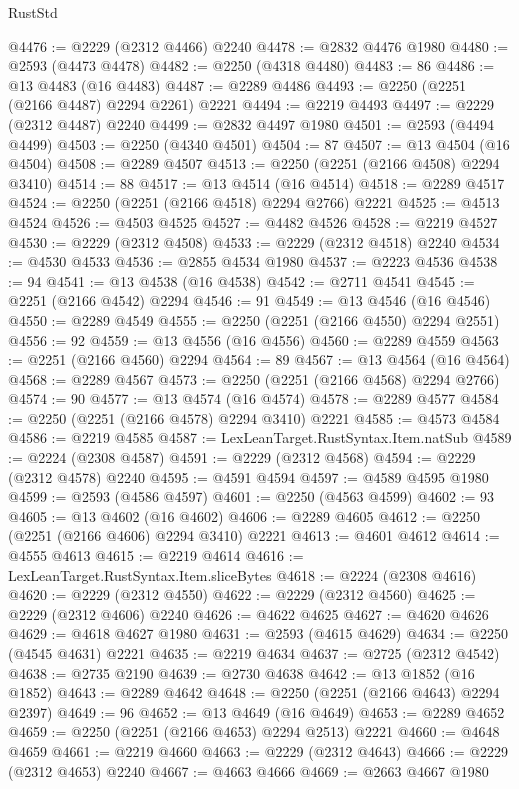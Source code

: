 \begin{lexlean}{RustStd}
\begin{coremodule}
@4476 := @2229 (@2312 @4466) @2240
@4478 := @2832 @4476 @1980
@4480 := @2593 (@4473 @4478)
@4482 := @2250 (@4318 @4480)
@4483 := 86
@4486 := @13 @4483 (@16 @4483)
@4487 := @2289 @4486
@4493 := @2250 (@2251 (@2166 @4487) @2294 @2261) @2221
@4494 := @2219 @4493
@4497 := @2229 (@2312 @4487) @2240
@4499 := @2832 @4497 @1980
@4501 := @2593 (@4494 @4499)
@4503 := @2250 (@4340 @4501)
@4504 := 87
@4507 := @13 @4504 (@16 @4504)
@4508 := @2289 @4507
@4513 := @2250 (@2251 (@2166 @4508) @2294 @3410)
@4514 := 88
@4517 := @13 @4514 (@16 @4514)
@4518 := @2289 @4517
@4524 := @2250 (@2251 (@2166 @4518) @2294 @2766) @2221
@4525 := @4513 @4524
@4526 := @4503 @4525
@4527 := @4482 @4526
@4528 := @2219 @4527
@4530 := @2229 (@2312 @4508)
@4533 := @2229 (@2312 @4518) @2240
@4534 := @4530 @4533
@4536 := @2855 @4534 @1980
@4537 := @2223 @4536
@4538 := 94
@4541 := @13 @4538 (@16 @4538)
@4542 := @2711 @4541
@4545 := @2251 (@2166 @4542) @2294
@4546 := 91
@4549 := @13 @4546 (@16 @4546)
@4550 := @2289 @4549
@4555 := @2250 (@2251 (@2166 @4550) @2294 @2551)
@4556 := 92
@4559 := @13 @4556 (@16 @4556)
@4560 := @2289 @4559
@4563 := @2251 (@2166 @4560) @2294
@4564 := 89
@4567 := @13 @4564 (@16 @4564)
@4568 := @2289 @4567
@4573 := @2250 (@2251 (@2166 @4568) @2294 @2766)
@4574 := 90
@4577 := @13 @4574 (@16 @4574)
@4578 := @2289 @4577
@4584 := @2250 (@2251 (@2166 @4578) @2294 @3410) @2221
@4585 := @4573 @4584
@4586 := @2219 @4585
@4587 := LexLeanTarget.RustSyntax.Item.natSub
@4589 := @2224 (@2308 @4587)
@4591 := @2229 (@2312 @4568)
@4594 := @2229 (@2312 @4578) @2240
@4595 := @4591 @4594
@4597 := @4589 @4595 @1980
@4599 := @2593 (@4586 @4597)
@4601 := @2250 (@4563 @4599)
@4602 := 93
@4605 := @13 @4602 (@16 @4602)
@4606 := @2289 @4605
@4612 := @2250 (@2251 (@2166 @4606) @2294 @3410) @2221
@4613 := @4601 @4612
@4614 := @4555 @4613
@4615 := @2219 @4614
@4616 := LexLeanTarget.RustSyntax.Item.sliceBytes
@4618 := @2224 (@2308 @4616)
@4620 := @2229 (@2312 @4550)
@4622 := @2229 (@2312 @4560)
@4625 := @2229 (@2312 @4606) @2240
@4626 := @4622 @4625
@4627 := @4620 @4626
@4629 := @4618 @4627 @1980
@4631 := @2593 (@4615 @4629)
@4634 := @2250 (@4545 @4631) @2221
@4635 := @2219 @4634
@4637 := @2725 (@2312 @4542)
@4638 := @2735 @2190
@4639 := @2730 @4638
@4642 := @13 @1852 (@16 @1852)
@4643 := @2289 @4642
@4648 := @2250 (@2251 (@2166 @4643) @2294 @2397)
@4649 := 96
@4652 := @13 @4649 (@16 @4649)
@4653 := @2289 @4652
@4659 := @2250 (@2251 (@2166 @4653) @2294 @2513) @2221
@4660 := @4648 @4659
@4661 := @2219 @4660
@4663 := @2229 (@2312 @4643)
@4666 := @2229 (@2312 @4653) @2240
@4667 := @4663 @4666
@4669 := @2663 @4667 @1980

\end{coremodule}
\end{lexlean}
